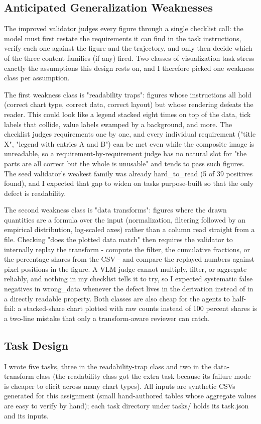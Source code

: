 \documentclass[11pt]{article}
\begin{document}
\subsection{Anticipated Generalization Weaknesses}
The improved validator judges every figure through a single checklist call: the model must first restate the requirements it can find in the task instructions, verify each one against the figure and the trajectory, and only then decide which of the three content families (if any) fired. Two classes of visualization task stress exactly the assumptions this design rests on, and I therefore picked one weakness class per assumption.

The first weakness class is "readability traps": figures whose instructions all hold (correct chart type, correct data, correct layout) but whose rendering defeats the reader. This could look like a legend stacked eight times on top of the data, tick labels that collide, value labels swamped by a background, and more. The checklist judges requirements one by one, and every individual requirement ("title X", "legend with entries A and B") can be met even while the composite image is unreadable, so a requirement-by-requirement judge has no natural slot for "the parts are all correct but the whole is unusable" and tends to pass such figures. The seed validator's weakest family was already hard_to_read (5 of 39 positives found), and I expected that gap to widen on tasks purpose-built so that the only defect is readability.

The second weakness class is "data transforms": figures where the drawn quantities are a formula over the input (normalization, filtering followed by an empirical distribution, log-scaled axes) rather than a column read straight from a file. Checking "does the plotted data match" then requires the validator to internally replay the transform - compute the filter, the cumulative fractions, or the percentage shares from the CSV - and compare the replayed numbers against pixel positions in the figure. A VLM judge cannot multiply, filter, or aggregate reliably, and nothing in my checklist tells it to try, so I expected systematic false negatives in wrong_data whenever the defect lives in the derivation instead of in a directly readable property. Both classes are also cheap for the agents to half-fail: a stacked-share chart plotted with raw counts instead of 100 percent shares is a two-line mistake that only a transform-aware reviewer can catch.

\subsection{Task Design}
I wrote five tasks, three in the readability-trap class and two in the data-transform class (the readability class got the extra task because its failure mode is cheaper to elicit across many chart types). All inputs are synthetic CSVs generated for this assignment (small hand-authored tables whose aggregate values are easy to verify by hand); each task directory under tasks/ holds its task.json and its inputs.
\end{document}
